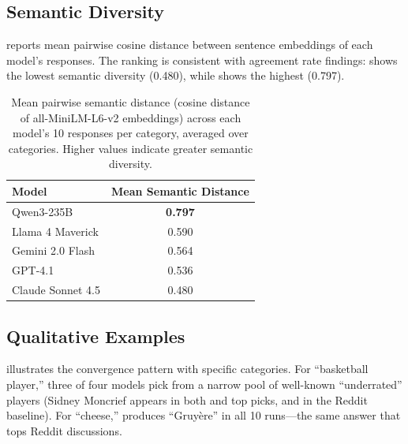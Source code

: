 \subsection{Semantic Diversity}
\label{sec:semantic}

 reports mean pairwise cosine distance between sentence embeddings of each model's responses. The ranking is consistent with agreement rate findings: \claude shows the lowest semantic diversity (0.480), while \qwen shows the highest (0.797).

\begin{table}[t]
    \centering
    \caption{Mean pairwise semantic distance (cosine distance of all-MiniLM-L6-v2 embeddings) across each model's 10 responses per category, averaged over categories. Higher values indicate greater semantic diversity.}
    \begin{tabular}{@{}lc@{}}
        \toprule
        \textbf{Model} & \textbf{Mean Semantic Distance} \\
        \midrule
        Qwen3-235B & \textbf{0.797} \\
        Llama 4 Maverick & 0.590 \\
        Gemini 2.0 Flash & 0.564 \\
        GPT-4.1 & 0.536 \\
        Claude Sonnet 4.5 & 0.480 \\
        \bottomrule
    \end{tabular}
    \label{tab:semantic}
\end{table}

\subsection{Qualitative Examples}
\label{sec:examples}

 illustrates the convergence pattern with specific categories. For ``basketball player,'' three of four models pick from a narrow pool of well-known ``underrated'' players (Sidney Moncrief appears in both \gptfour and \gemini top picks, and in the Reddit baseline). For ``cheese,'' \claude produces ``Gruy\`{e}re'' in all 10 runs---the same answer that tops Reddit discussions.

